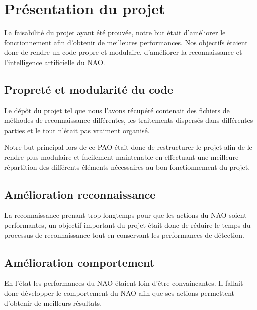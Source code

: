 \section{Présentation du projet}
\label{sec:Présentation du projet}

  \par La faisabilité du projet ayant été prouvée, notre but était d'améliorer le fonctionnement afin d'obtenir de meilleures performances.
  Nos objectifs étaient donc de rendre un code propre et modulaire, d'améliorer la reconnaissance et l'intelligence artificielle du NAO.

  \subsection{Propreté et modularité du code}
    \par Le dépôt du projet tel que nous l'avons récupéré contenait des fichiers  de méthodes de reconnaissance différentes, les traitements dispersés dans différentes parties et le tout n'était pas vraiment organisé.
    \par Notre but principal lors de ce PAO était donc de restructurer le projet afin de le rendre plus modulaire et facilement maintenable en effectuant une meilleure répartition des différents éléments nécessaires au bon fonctionnement du projet.

  \subsection{Amélioration reconnaissance}
    \par La reconnaissance prenant trop longtemps pour que les actions du NAO soient performantes, un objectif important du projet était donc de réduire le temps du processus de reconnaissance tout en conservant les performances de détection.

  \subsection{Amélioration comportement}
    \par En l'état les performances du NAO étaient loin d'être convaincantes.
    Il fallait donc développer le comportement du NAO afin que ses actions permettent d'obtenir de meilleurs résultats.

\pagebreak
